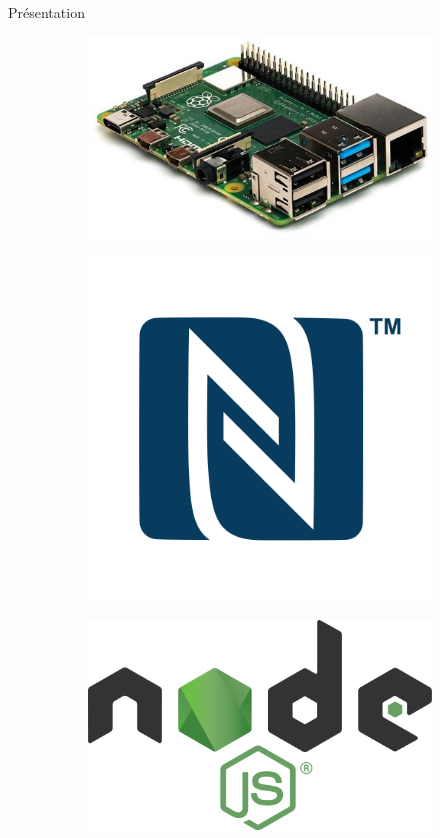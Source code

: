 \documentclass[aspectratio=169]{beamer}
\begin{document}
\begin{frame}{Présentation}
  \begin{figure}
    \begin{subfigure}{.2\textwidth}
      \centering
      \includegraphics[width=.8\linewidth]{../assets/raspi.jpeg}
    \end{subfigure}
    \begin{subfigure}{.2\textwidth}
      \centering
      \includegraphics[width=.8\linewidth]{../assets/nfc.png}
    \end{subfigure}
    \begin{subfigure}{.2\textwidth}
      \centering
      \includegraphics[width=.8\linewidth]{../assets/nodejs.png}
    \end{subfigure}
  \end{figure}
\end{frame}
\end{document}
